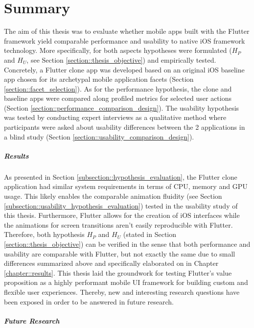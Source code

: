 \chapter{Summary} \label{chapter::summary}
The aim of this thesis was to evaluate whether mobile apps built with the Flutter framework yield comparable performance and usability to native iOS framework technology.
More specifically, for both aspects hypotheses were formulated ($H_P$ and $H_U$, see Section \ref{section::thesis_objective}) and empirically tested.
Concretely, a Flutter clone app was developed based on an original iOS baseline app chosen for its archetypal mobile application facets (Section \ref{section::facet_selection}).
As for the performance hypothesis, the clone and baseline apps were compared along profiled metrics for selected user actions (Section \ref{section::performance_comparison_design}).
The usability hypothesis was tested by conducting expert interviews as a qualitative method where participants were asked about usability
differences between the 2 applications in a blind study (Section \ref{section::usability_comparison_design}).
\paragraph*{Results}

As presented in Section \ref{subsection::hypothesis_evaluation}, the Flutter clone application had similar system requirements in terms of CPU, memory and GPU usage. This likely enables the 
comparable animation fluidity (see Section \ref{subsection::usability_hypothesis_evaluation}) tested in the usability study of this thesis. Furthermore, Flutter allows for the creation of iOS interfaces while the animations for
screen transitions aren't easily reproducible with Flutter. 
Therefore, both hypothesis $H_P$ and $H_U$ (stated in Section \ref{section::thesis_objective}) can be verified in the sense that both performance and usability are comparable with Flutter, but not exactly the same due to small differences summarized above and specifically elaborated on in Chapter \ref{chapter::results}.
This thesis laid the groundwork for testing Flutter's value proposition as a highly performant mobile UI framework for building 
custom and flexible user experiences. Thereby, new and interesting research questions have been exposed in order to be answered in future research.
\paragraph*{Future Research}

